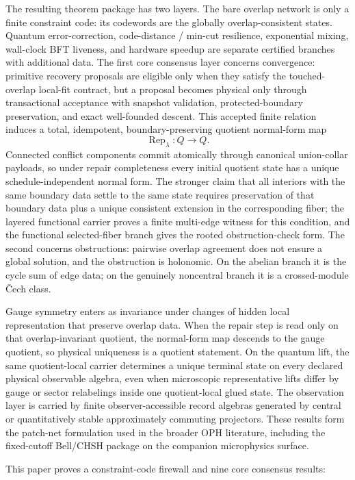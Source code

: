 \documentclass[11pt]{article}
\theoremstyle{remark}
\theoremstyle{plain}
\begin{document}
The resulting theorem package has two layers. The bare overlap network is only a finite
constraint code: its codewords are the globally overlap-consistent states. Quantum
error-correction, code-distance / min-cut resilience, exponential mixing, wall-clock BFT
liveness, and hardware speedup are separate certified branches with additional data. The first
core consensus layer concerns convergence: primitive recovery proposals are eligible only when
they satisfy the touched-overlap local-fit contract, but a proposal becomes physical only through
transactional acceptance with snapshot validation, protected-boundary preservation, and exact
well-founded descent. This accepted finite relation induces a total, idempotent,
boundary-preserving quotient normal-form map
\[
\operatorname{Rep}_\lambda:Q\to Q.
\]
Connected conflict components commit atomically through canonical union-collar payloads, so under
repair completeness every initial quotient state has a unique schedule-independent normal form.
The stronger claim that all interiors with the same boundary data settle to the same state
requires preservation of that boundary data plus a unique consistent extension in the
corresponding fiber; the layered functional carrier proves a finite multi-edge witness for this
condition, and the functional selected-fiber branch gives the rooted obstruction-check form. The
second concerns obstructions: pairwise overlap agreement does not ensure a
global solution, and the obstruction is holonomic. On the abelian branch it is the cycle sum of
edge data; on the genuinely noncentral branch it is a crossed-module \v{C}ech class.

Gauge symmetry enters as invariance under changes of hidden local representation that preserve
overlap data. When the repair step is read only on that overlap-invariant quotient, the
normal-form map descends to the gauge quotient, so physical uniqueness is a quotient statement.
On the quantum lift, the same quotient-local carrier determines a unique terminal state on every
declared physical observable algebra, even when microscopic representative lifts differ by gauge
or sector relabelings inside one quotient-local glued state.
The observation layer is carried by finite observer-accessible record algebras generated by
central or quantitatively stable approximately commuting projectors. These results form the
patch-net formulation used in the broader OPH literature, including the fixed-cutoff Bell/CHSH
package on the companion microphysics surface.

This paper proves a constraint-code firewall and nine core consensus results:
\end{document}
